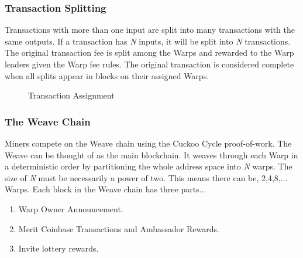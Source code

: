 \documentclass{article}
\begin{document}
\subsubsection{Transaction Splitting}

Transactions with more than one input are split into many transactions with the same
outputs.  If a transaction has \emph{N} inputs, it will be split into \emph{N} transactions.  The original transaction fee is split among the Warps and rewarded to the Warp
leaders given the Warp fee rules.  The original transaction is considered complete when
all splits appear in blocks on their assigned Warps.

\begin{figure}[H]
    \begin{center}
    \end{center}
    \caption{Transaction Assignment}
\end{figure}

\subsubsection{The Weave Chain}

Miners compete on the Weave chain using the Cuckoo Cycle proof-of-work. 
The Weave can be thought of as the main blockchain.  It weaves through each Warp
in a deterministic order by partitioning the whole address space into \emph{N} warps.
The size of \emph{N} must be necessarily a power of two.  This means there can be,
2,4,8,...  Warps.  Each block in the Weave chain has three parts...

\begin{enumerate}
    \item Warp Owner Announcement.
    \item Merit Coinbase Transactions and Ambassador Rewards.
    \item Invite lottery rewards.
\end{enumerate}
\end{document}

